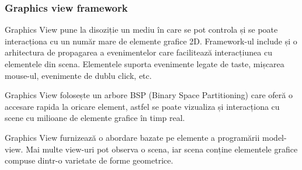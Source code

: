\subsubsection{Graphics view framework}

Graphics View pune la disoziție un mediu în care se pot controla și se poate interacționa cu un număr mare de elemente grafice 2D. 
Framework-ul include și o arhitectura de propagarea a evenimentelor care facilitează interacțiunea cu elementele din scena. 
Elementele suporta evenimente legate de taste, mișcarea mouse-ul, evenimente de dublu click, etc. \newline

Graphics View folosește un arbore BSP (Binary Space Partitioning) care oferă o accesare rapida la oricare element, astfel se poate 
vizualiza și interacționa cu scene cu milioane de elemente grafice în timp real.\newline

Graphics View furnizează o abordare bazate pe elemente a programării model-view. Mai multe view-uri pot observa o scena, 
iar scena conține elementele grafice compuse dintr-o varietate de forme geometrice.\newline

